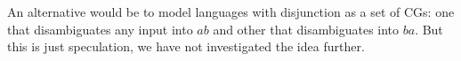\documentclass[11pt]{article}
\def\t#1{\texttt{#1}}
\def\maxAmbFSA#1{$\langle \Sigma,S \rangle_#1$}
\begin{document}
An alternative would be to model languages with disjunction as a set of CGs: 
one that disambiguates any input into $ab$ and other that disambiguates 
into $ba$. But this is just speculation, we have not investigated the idea further. 






\end{document}
